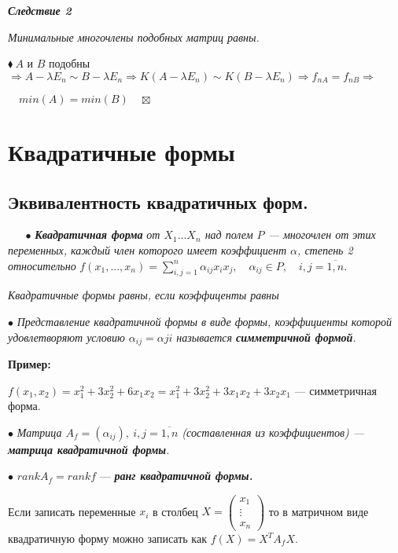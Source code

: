 \documentclass[a4paper, 12pt]{report}
\begin{document}
	
	
	
	\par\bigskip
	\textit{\textbf{Следствие 2}}
	
	\textit{Минимальные многочлены подобных матриц равны.}
	\par\bigskip
	$\blacklozenge\ A$ и $B$ подобны $\Rightarrow A - \lambda E_n \sim B - \lambda E_n \Rightarrow K(A-\lambda E_n) \sim K(B - \lambda E_n) \Rightarrow f_{nA} = f_{nB} \Rightarrow$
	
	$\quad min(A) = min(B) \quad \boxtimes$
	
	
	
	
	
	
	
	
	
	
	\chapter{Квадратичные формы}
	
	
	\section{Эквивалентность квадратичных форм.}
	
	$\quad \;$ $\bullet$ \textbf{\textit{Квадратичная форма}} \textit{от $X_1 ... X_n$ над полем $P$ --- многочлен от этих переменных, каждый член которого имеет коэффициент $\alpha$, степень 2 относительно} $f(x_1, ..., x_n) = \sum\limits_{i,j=1}^n \alpha_{ij} x_i x_j, \quad \alpha_{ij} \in P, \quad i,j = \overline{1, n}$.
	\par\bigskip
	\textit{Квадратичные формы равны, если коэффиценты равны}
	\par\bigskip
	$\bullet$ \textit{Представление квадратичной формы в виде формы, коэффициенты которой удовлетворяют условию $\alpha_{ij} = \alpha{ji}$ называется \textbf{симметричной формой}.}
	\par\bigskip
	\textbf{Пример:}
	
	$f(x_1, x_2) = x_1^2 + 3 x_2^2 + 6 x_1 x_2 = x_1^2 + 3 x_2^2 + 3 x_1 x_2 + 3 x_2 x_1$ --- симметричная форма.
	\par\bigskip
	$\bullet$ \textit{Матрица $A_f = (\alpha_{ij}),\ i, j = \overline{1,n}$ (составленная из коэффициентов) --- \textbf{матрица квадратичной формы}.}
	\par\bigskip
	$\bullet$ $rank A_f = rank f$ --- \textit{\textbf{ранг квадратичной формы.}}
	\par\bigskip
	Если записать переменные $x_i$ в столбец $X = \begin{pmatrix} x_1 \\ \vdots \\ x_n \end{pmatrix}$ то в матричном виде квадратичную форму можно записать как $f(X) = X^T A_f X.$ 
	
\end{document}

